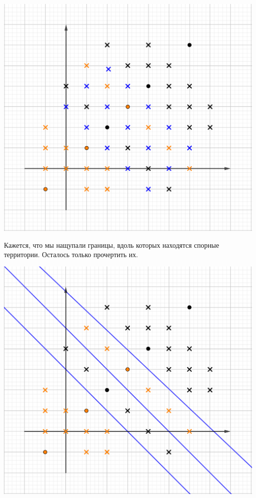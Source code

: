 \documentclass[12pt, a4paper, oneside]{article}
\theoremstyle{plain} %
\theoremstyle{definition}
\begin{document}
\begin{solution}
\begin{enumerate}
	\begin{center}
	    \includegraphics[scale=0.18]{2knn_2.png}
	\end{center} 
	
	Кажется, что мы нащупали границы, вдоль которых находятся спорные территории. Осталось только прочертить их.	
	
	\begin{center}
	    \includegraphics[scale=0.18]{2knn_3.png}
	\end{center} 
	

\end{enumerate}
\end{solution}
\end{document}

